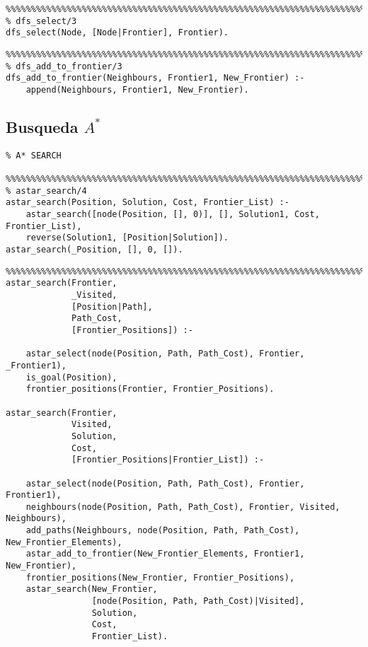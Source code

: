 \documentclass[a4paper,12pt]{report}
\begin{document}
\begin{verbatim}
%%%%%%%%%%%%%%%%%%%%%%%%%%%%%%%%%%%%%%%%%%%%%%%%%%%%%%%%%%%%%%%%%%%%%%%%%%%%%%%
% dfs_select/3
dfs_select(Node, [Node|Frontier], Frontier).

\end{verbatim}

\begin{verbatim}
%%%%%%%%%%%%%%%%%%%%%%%%%%%%%%%%%%%%%%%%%%%%%%%%%%%%%%%%%%%%%%%%%%%%%%%%%%%%%%%
% dfs_add_to_frontier/3
dfs_add_to_frontier(Neighbours, Frontier1, New_Frontier) :-
    append(Neighbours, Frontier1, New_Frontier).

\end{verbatim}

\subsection{Busqueda $A^{*}$}

\begin{verbatim}
% A* SEARCH

%%%%%%%%%%%%%%%%%%%%%%%%%%%%%%%%%%%%%%%%%%%%%%%%%%%%%%%%%%%%%%%%%%%%%%%%%%%%%%%
% astar_search/4
astar_search(Position, Solution, Cost, Frontier_List) :-
    astar_search([node(Position, [], 0)], [], Solution1, Cost, Frontier_List),
    reverse(Solution1, [Position|Solution]).
astar_search(_Position, [], 0, []).

\end{verbatim}

\begin{verbatim}
%%%%%%%%%%%%%%%%%%%%%%%%%%%%%%%%%%%%%%%%%%%%%%%%%%%%%%%%%%%%%%%%%%%%%%%%%%%%%%%
astar_search(Frontier,
             _Visited,
             [Position|Path],
             Path_Cost,
             [Frontier_Positions]) :-

    astar_select(node(Position, Path, Path_Cost), Frontier, _Frontier1),
    is_goal(Position),
    frontier_positions(Frontier, Frontier_Positions).

astar_search(Frontier,
             Visited,
             Solution,
             Cost,
             [Frontier_Positions|Frontier_List]) :-

    astar_select(node(Position, Path, Path_Cost), Frontier, Frontier1),
    neighbours(node(Position, Path, Path_Cost), Frontier, Visited, Neighbours),
    add_paths(Neighbours, node(Position, Path, Path_Cost), New_Frontier_Elements),
    astar_add_to_frontier(New_Frontier_Elements, Frontier1, New_Frontier),
    frontier_positions(New_Frontier, Frontier_Positions),
    astar_search(New_Frontier,
                 [node(Position, Path, Path_Cost)|Visited],
                 Solution,
                 Cost,
                 Frontier_List).

\end{verbatim}
\end{document}
